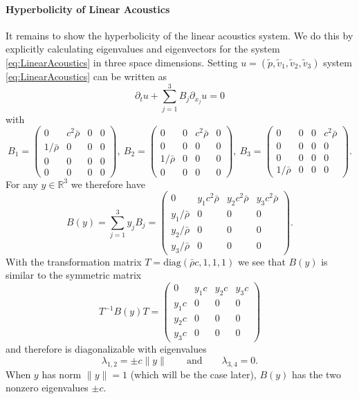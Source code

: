 \documentclass[a4paper,12pt]{article}
\theoremstyle{definition}
\theoremstyle{definition}
\begin{document}
\paragraph{Hyperbolicity of Linear Acoustics}
It remains to show the hyperbolicity of the linear acoustics system. We do this by
explicitly calculating eigenvalues and eigenvectors for the system \eqref{eq:LinearAcoustics}
in three space dimensions.
Setting $u=(\tilde{p},\tilde{v}_1,\tilde{v}_2,\tilde{v}_3)$ system \eqref{eq:LinearAcoustics} can be written as
\begin{equation*}
\partial_t u + \sum_{j=1}^3 B_j \partial_{x_j} u = 0
\end{equation*}
with
\begin{equation*}
B_1 = \left( \begin{smallmatrix}
0  & c^2\bar\rho & 0 & 0\\
1/\bar\rho & 0 & 0 & 0\\
0 & 0 & 0 & 0\\
0 & 0 & 0 & 0
\end{smallmatrix} \right),
\  B_2 = \left( \begin{smallmatrix}
0  & 0 & c^2\bar\rho  & 0\\
0 & 0 & 0 & 0\\
1/\bar\rho & 0 & 0 & 0\\
0 & 0 & 0 & 0
\end{smallmatrix} \right),
\  B_3 = \left( \begin{smallmatrix}
0  & 0 & 0 & c^2\bar\rho \\
0 & 0 & 0 & 0\\
0 & 0 & 0 & 0\\
1/\bar\rho & 0 & 0 & 0
\end{smallmatrix} \right) .
\end{equation*}
For any $y\in\mathbb{R}^3$ we therefore have
\begin{equation*}
B(y) = \sum_{j=1}^3 y_j B_j = \left( \begin{array}{cccc}
0 & y_1 c^2 \bar\rho & y_2 c^2 \bar\rho & y_3 c^2 \bar\rho \\
y_1/\bar\rho & 0 & 0 & 0\\
y_2/\bar\rho & 0 & 0 & 0\\
y_3/\bar\rho & 0 & 0 & 0
\end{array}\right) .
\end{equation*}
With the transformation matrix $T=\text{diag}(\bar\rho c,1,1,1)$ we see that $B(y)$ is similar
to the symmetric matrix
\begin{equation*}
T^{-1}B(y)T =\left( \begin{array}{cccc}
0 & y_1 c & y_2 c & y_3 c \\
y_1 c & 0 & 0 & 0\\
y_2 c & 0 & 0 & 0\\
y_3 c & 0 & 0 & 0
\end{array}\right)
\end{equation*}
and therefore is diagonalizable with eigenvalues
\begin{equation*}
\lambda_{1,2} = \pm c \| y \| \qquad \text{and} \qquad \lambda_{3,4} = 0 .
\end{equation*}
When $y$ has norm $\|y\|=1$ (which will be the case later), $B(y)$ has the
two nonzero eigenvalues $\pm c$.
\end{document}
